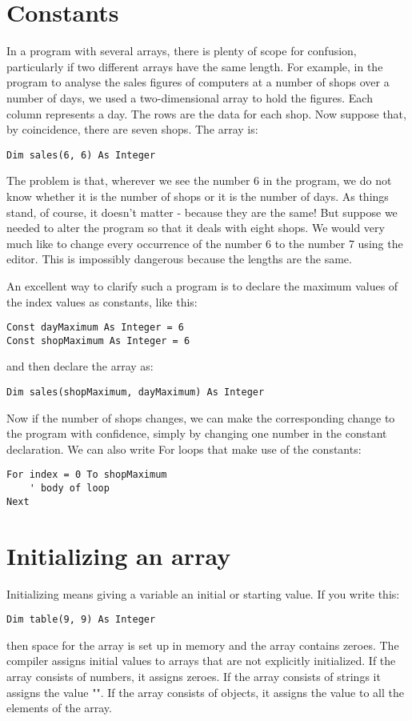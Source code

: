 	\section{Constants}
		In a program with several arrays, there is plenty of scope for confusion, particularly if two different arrays have the same length. For example, in the program to analyse the sales figures of computers at a number of shops over a number of days, we used a two-dimensional array to hold the figures. Each column represents a day. The rows are the data for each shop. Now suppose that, by coincidence, there are seven shops. The array is:
		\begin{lstlisting}
Dim sales(6, 6) As Integer
		\end{lstlisting}
		The problem is that, wherever we see the number 6 in the program, we do not know whether it is the number of shops or it is the number of days. As things stand, of course, it doesn't matter - because they are the same! But suppose we needed to alter the program so that it deals with eight shops. We would very much like to change every occurrence of the number 6 to the number 7 using the editor. This is impossibly dangerous because the lengths are the same.
		
		An excellent way to clarify such a program is to declare the maximum values of the index values as constants, like this:
		\begin{lstlisting}
Const dayMaximum As Integer = 6
Const shopMaximum As Integer = 6
		\end{lstlisting}
		and then declare the array as:
		\begin{lstlisting}
Dim sales(shopMaximum, dayMaximum) As Integer
		\end{lstlisting}
		Now if the number of shops changes, we can make the corresponding change to the program with confidence, simply by changing one number in the constant declaration. We can also write For loops that make use of the constants:
		\begin{lstlisting}
For index = 0 To shopMaximum
	' body of loop
Next
		\end{lstlisting}


	\section{Initializing an array}
		Initializing means giving a variable an initial or starting value. If you write this:
		\begin{lstlisting}
Dim table(9, 9) As Integer
		\end{lstlisting}
		then space for the array is set up in memory and the array contains zeroes. The compiler assigns initial values to arrays that are not explicitly initialized. If the array consists of numbers, it assigns zeroes. If the array consists of strings it assigns the value "". If the array consists of objects, it assigns the value  to all the elements of the array.
		
